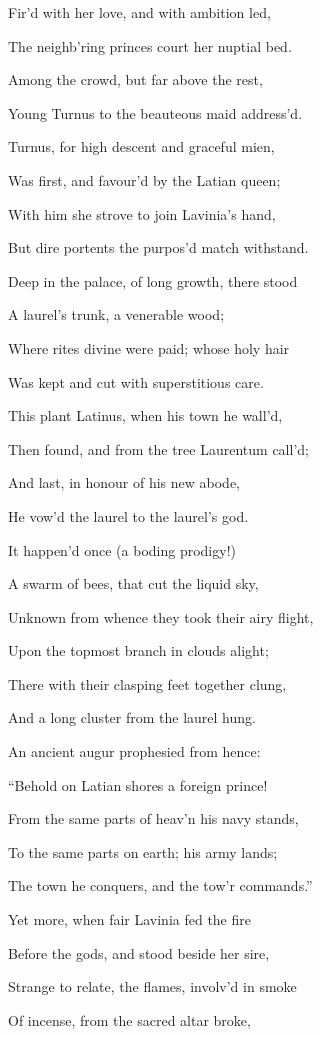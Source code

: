 Fir’d with her love, and with ambition led,

The neighb’ring princes court her nuptial bed.

Among the crowd, but far above the rest,

Young Turnus to the beauteous maid address’d.

Turnus, for high descent and graceful mien,

Was first, and favour’d by the Latian queen;

With him she strove to join Lavinia’s hand,

But dire portents the purpos’d match withstand.

Deep in the palace, of long growth, there stood

A laurel’s trunk, a venerable wood;

Where rites divine were paid; whose holy hair

Was kept and cut with superstitious care.

This plant Latinus, when his town he wall’d,

Then found, and from the tree Laurentum call’d;

And last, in honour of his new abode,

He vow’d the laurel to the laurel’s god.

It happen’d once (a boding prodigy!)

A swarm of bees, that cut the liquid sky,

Unknown from whence they took their airy flight,

Upon the topmost branch in clouds alight;

There with their clasping feet together clung,

And a long cluster from the laurel hung.

An ancient augur prophesied from hence:

“Behold on Latian shores a foreign prince!

From the same parts of heav’n his navy stands,

To the same parts on earth; his army lands;

The town he conquers, and the tow’r commands.”

Yet more, when fair Lavinia fed the fire

Before the gods, and stood beside her sire,

Strange to relate, the flames, involv’d in smoke

Of incense, from the sacred altar broke,

